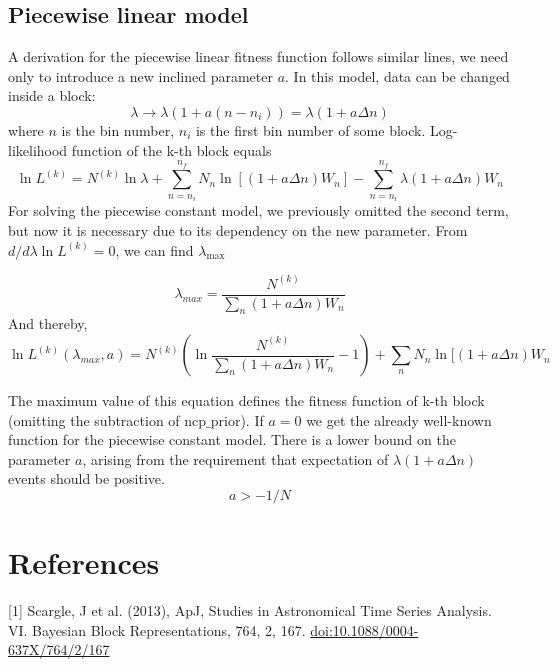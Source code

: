 \documentclass{article}
\begin{document}
\subsection{Piecewise linear model}
A derivation for the piecewise linear fitness function follows similar lines, we need only to introduce a new inclined parameter $a$. In this model, data can be changed inside a block:
\begin{equation}
    \lambda \rightarrow\lambda(1+a(n - n_i)) = \lambda(1+a\Delta n)
\end{equation}
where $n$ is the bin number, $n_i$ is the first bin number of some block.
Log-likelihood function of the k-th block equals
\begin{equation}
    \ln L^{(k)} =  N^{(k)}\ln\lambda + \sum\limits_{n=n_i}^{n_f} N_n\ln[(1+a\Delta n)W_n]-\sum\limits_{n=n_i}^{n_f}\lambda (1+a\Delta n)W_n
\end{equation}
For solving the piecewise constant model, we previously omitted the second term, but now it is necessary due to its dependency on the new parameter. From $d/d\lambda \ln L^{(k)} = 0$, we can find $\lambda_{\text{max}}$

\begin{equation}
\lambda_{max}=\frac{N^{(k)}}{\sum\limits_{n} (1+a\Delta n)W_n}
\end{equation}
And thereby,
\begin{equation}
    \ln L^{(k)}(\lambda_{max}, a) = N^{(k)}\left(\ln\frac{N^{(k)}}{\sum\limits_{n} (1+a\Delta n)W_n} - 1\right) + \sum\limits_{n} N_n\ln[(1+a\Delta n)W_n
\end{equation}

The maximum value of this equation defines the fitness function of k-th block (omitting the subtraction of $\text{ncp\_prior}$). If $a=0$ we get the already well-known function for the piecewise constant model.
There is a lower bound on the parameter $a$, arising from the requirement that expectation of $\lambda(1+a\Delta n)$ events should be positive.
$$a>-1/N$$

\section{References}
[1] Scargle, J et al. (2013), ApJ, Studies in Astronomical Time Series Analysis. VI. Bayesian Block Representations, 764, 2, 167. \href{https://ui.adsabs.harvard.edu/abs/2013ApJ...764..167S/abstract}{doi:10.1088/0004-637X/764/2/167}
\end{document}
